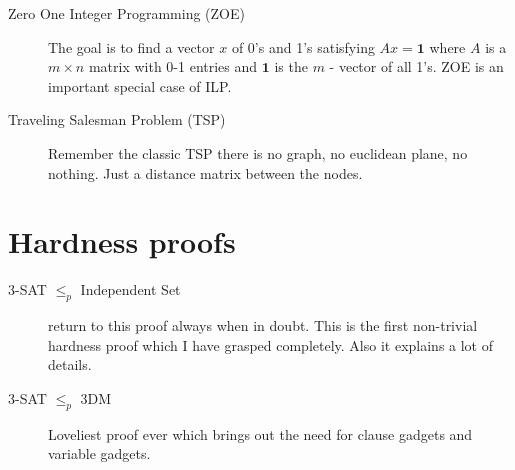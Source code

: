 \begin{description}
\item[{Zero One Integer Programming (ZOE)}] The goal is to find a vector \(x\) of 0's and 1's satisfying \(Ax=\mathbf{1}\)
where \(A\) is a \(m \times n\) matrix with 0-1 entries and \(\mathbf{1}\) is the \(m\) - vector of all 1's. 
ZOE is an important special case of ILP.

\item[{Traveling Salesman Problem (TSP)}] Remember the classic TSP there is no graph, no euclidean plane, no nothing. 
Just a distance matrix between the nodes.
\end{description}

\section{Hardness proofs}
\label{sec:orgd0dfccc}
\begin{description}
\item[{3-SAT \(\leq_p\) Independent Set}] return to this proof always when in doubt. This is the first 
non-trivial hardness proof which I have grasped completely. Also it explains a lot of details.

\item[{3-SAT \(\leq_p\) 3DM}] Loveliest proof ever which brings out the need for clause gadgets and 
variable gadgets.
\end{description}




